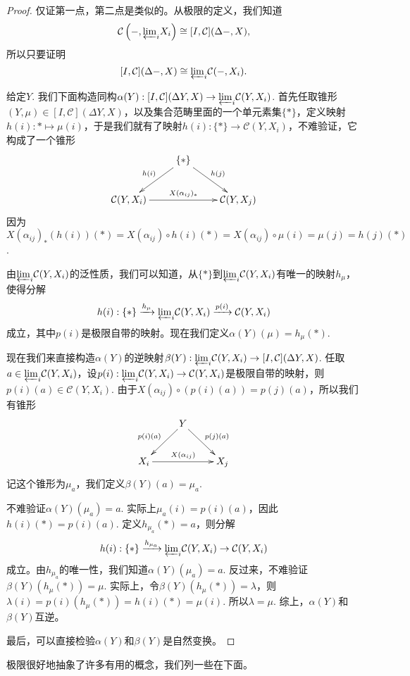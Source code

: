 \begin{proof}
	仅证第一点，第二点是类似的。从极限的定义，我们知道
	\[
	\mathcal{C}\left(-,{\varprojlim}_i X_i\right)\cong [I,\mathcal{C}](\Delta -,X),
	\]
	所以只要证明
	\[
	[I,\mathcal{C}](\Delta -,X)\cong {\varprojlim}_i \mathcal{C}(-,X_i).
	\]

	给定$Y$. 我们下面构造同构$\alpha(Y):[I,\mathcal{C}](\Delta Y,X)\to {\varprojlim}_i \mathcal{C}(Y,X_i)$. 首先任取锥形$(Y,\mu)\in [I,\mathcal{C}](\Delta Y,X)$，以及集合范畴里面的一个单元素集$\{*\}$，定义映射$h(i):*\mapsto \mu(i)$，于是我们就有了映射$h(i):\{*\}\to \mathcal{C}(Y,X_i)$，不难验证，它构成了一个锥形
	\[
		\xymatrix{
			&\{*\} \ar[dl]_{h(i)}\ar[dr]^{h(j)}&\\
			\mathcal{C}(Y,X_i)\ar[rr]^{X(\alpha_{ij})_*}&&\mathcal{C}(Y,X_j)
		}
	\]
	因为$X(\alpha_{ij})_*(h(i))(*)=X(\alpha_{ij})\circ h(i)(*)=X(\alpha_{ij})\circ \mu(i)=\mu(j)=h(j)(*)$.

	由${\varprojlim}_i \mathcal{C}(Y,X_i)$的泛性质，我们可以知道，从$\{*\}$到${\varprojlim}_i \mathcal{C}(Y,X_i)$有唯一的映射$h_\mu$，使得分解
	\[
	h(i):\{*\}\xrightarrow{h_\mu} {\varprojlim}_i \mathcal{C}(Y,X_i) \xrightarrow{p(i)} \mathcal{C}(Y,X_i)
	\]
	成立，其中$p(i)$是极限自带的映射。现在我们定义$\alpha(Y)(\mu)=h_\mu(*)$.

	现在我们来直接构造$\alpha(Y)$的逆映射$\beta(Y):{\varprojlim}_i \mathcal{C}(Y,X_i)\to [I,\mathcal{C}](\Delta Y,X)$. 任取$a\in {\varprojlim}_i \mathcal{C}(Y,X_i)$，设$p(i):{\varprojlim}_i \mathcal{C}(Y,X_i)\to \mathcal{C}(Y,X_i)$是极限自带的映射，则$p(i)(a)\in \mathcal{C}(Y,X_i)$. 由于$X(\alpha_{ij})\circ (p(i)(a))=p(j)(a)$，所以我们有锥形
	\[
		\xymatrix{
			&Y \ar[dl]_{p(i)(a)}\ar[dr]^{p(j)(a)}&\\
			X_i\ar[rr]^{X(\alpha_{ij})}&&X_j
		}
	\]
	记这个锥形为$\mu_a$，我们定义$\beta(Y)(a)=\mu_a$.

	不难验证$\alpha(Y)(\mu_a)=a$. 实际上$\mu_a(i)=p(i)(a)$，因此$h(i)(*)=p(i)(a)$. 定义$h_{\mu_a}(*)=a$，则分解
	\[
	h(i):\{*\}\xrightarrow{h_{\mu_a}} {\varprojlim}_i \mathcal{C}(Y,X_i) \to \mathcal{C}(Y,X_i)
	\]
	成立。由$h_{\mu_a}$的唯一性，我们知道$\alpha(Y)(\mu_a)=a$. 反过来，不难验证$\beta(Y)(h_\mu(*))=\mu$. 实际上，令$\beta(Y)(h_\mu(*))=\lambda$，则$\lambda(i)=p(i)(h_\mu(*))=h(i)(*)=\mu(i)$. 所以$\lambda=\mu$. 综上，$\alpha(Y)$和$\beta(Y)$互逆。

	最后，可以直接检验$\alpha(Y)$和$\beta(Y)$是自然变换。
\end{proof}

极限很好地抽象了许多有用的概念，我们列一些在下面。

